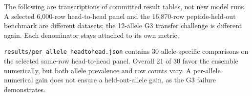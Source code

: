 
The following are transcriptions of committed result tables, not new model runs. A selected 6,000-row head-to-head panel and the 16,870-row peptide-held-out benchmark are different datasets; the 12-allele G3 transfer challenge is different again. Each denominator stays attached to its own metric.


\texttt{results/per\_allele\_headtohead.json} contains 30 allele-specific comparisons on the selected same-row head-to-head panel. Overall 21 of 30 favor the ensemble numerically, but both allele prevalence and row counts vary. A per-allele numerical gain does not ensure a held-out-allele gain, as the G3 failure demonstrates.

